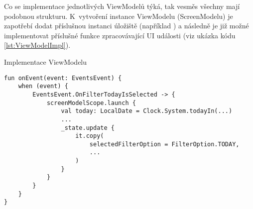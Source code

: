 Co se implementace jednotlivých ViewModelů týká, tak vesměs všechny mají podobnou strukturu. K~vytvoření instance ViewModelu (ScreenModelu)
je zapotřebí dodat příslušnou instanci úložiště (například ) a následně je již možné implementovat příslušné funkce
zpracovávající UI události (viz ukázka kódu \ref{lst:ViewModelImpl}). 


\begin{listing}[H]
\caption{Implementace ViewModelu}\label{lst:ViewModelImpl}
\begin{verbatim}
fun onEvent(event: EventsEvent) {
    when (event) {
        EventsEvent.OnFilterTodayIsSelected -> {
            screenModelScope.launch {
                val today: LocalDate = Clock.System.todayIn(...)
                ...
                _state.update {
                    it.copy(
                        selectedFilterOption = FilterOption.TODAY,
                        ...
                    )
                }
            }
        }
    }
}
\end{verbatim}
\end{listing}




